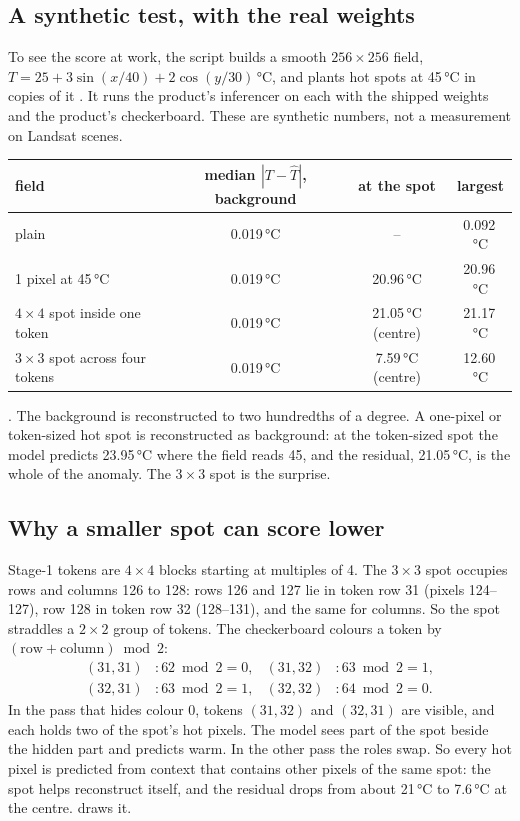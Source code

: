 \subsection{A synthetic test, with the real weights}

To see the score at work, the script builds a smooth $256\times256$ field, $T=25+3\sin(x/40)+2\cos(y/30)$\,°C, and
plants hot spots at 45\,°C in copies of it \tagA. It runs the product's inferencer on each with the shipped weights
and the product's checkerboard. These are synthetic numbers, not a measurement on Landsat scenes.
\begin{center}\small
\begin{tabular}{@{}lccc@{}}
\toprule
field & median $|T-\hat T|$, background & at the spot & largest\\
\midrule
plain & 0.019\,°C & -- & 0.092\,°C\\
1 pixel at 45\,°C & 0.019\,°C & 20.96\,°C & 20.96\,°C\\
$4\times4$ spot inside one token & 0.019\,°C & 21.05\,°C (centre) & 21.17\,°C\\
$3\times3$ spot across four tokens & 0.019\,°C & 7.59\,°C (centre) & 12.60\,°C\\
\bottomrule
\end{tabular}
\end{center}
\tagC. The background is reconstructed to two hundredths of a degree. A one-pixel or token-sized hot spot is
reconstructed as background: at the token-sized spot the model predicts 23.95\,°C where the field reads 45, and the
residual, 21.05\,°C, is the whole of the anomaly. The $3\times3$ spot is the surprise.

\subsection{Why a smaller spot can score lower}\label{sec:chakshu:straddle}

Stage-1 tokens are $4\times4$ blocks starting at multiples of 4. The $3\times3$ spot occupies rows and columns 126 to
128: rows 126 and 127 lie in token row 31 (pixels 124--127), row 128 in token row 32 (128--131), and the same for
columns. So the spot straddles a $2\times2$ group of tokens. The checkerboard colours a token by
$(\text{row}+\text{column}) \bmod 2$:
\begin{align*}
(31,31) &: 62 \bmod 2 = 0, & (31,32) &: 63 \bmod 2 = 1,\\
(32,31) &: 63 \bmod 2 = 1, & (32,32) &: 64 \bmod 2 = 0 .
\end{align*}
In the pass that hides colour 0, tokens $(31,32)$ and $(32,31)$ are visible, and each holds two of the spot's hot
pixels. The model sees part of the spot beside the hidden part and predicts warm. In the other pass the roles swap.
So every hot pixel is predicted from context that contains other pixels of the same spot: the spot helps
reconstruct itself, and the residual drops from about 21\,°C to 7.6\,°C at the centre. 
draws it.

